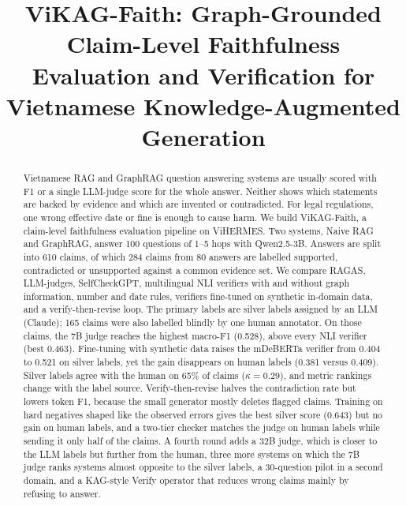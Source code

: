\documentclass[conference]{IEEEtran}
\begin{document}
\title{ViKAG-Faith: Graph-Grounded Claim-Level Faithfulness Evaluation and Verification for Vietnamese Knowledge-Augmented Generation}

\author{
}

\maketitle

\begin{abstract}
Vietnamese RAG and GraphRAG question answering systems are usually scored with F1 or a single LLM-judge score for the whole answer. Neither shows which statements are backed by evidence and which are invented or contradicted. For legal regulations, one wrong effective date or fine is enough to cause harm. We build ViKAG-Faith, a claim-level faithfulness evaluation pipeline on ViHERMES. Two systems, Naive RAG and GraphRAG, answer 100 questions of 1--5 hops with Qwen2.5-3B. Answers are split into 610 claims, of which 284 claims from 80 answers are labelled supported, contradicted or unsupported against a common evidence set. We compare RAGAS, LLM-judges, SelfCheckGPT, multilingual NLI verifiers with and without graph information, number and date rules, verifiers fine-tuned on synthetic in-domain data, and a verify-then-revise loop. The primary labels are silver labels assigned by an LLM (Claude); 165 claims were also labelled blindly by one human annotator. On those claims, the 7B judge reaches the highest macro-F1 (0.528), above every NLI verifier (best 0.463). Fine-tuning with synthetic data raises the mDeBERTa verifier from 0.404 to 0.521 on silver labels, yet the gain disappears on human labels (0.381 versus 0.409). Silver labels agree with the human on 65\% of claims ($\kappa=0.29$), and metric rankings change with the label source. Verify-then-revise halves the contradiction rate but lowers token F1, because the small generator mostly deletes flagged claims. Training on hard negatives shaped like the observed errors gives the best silver score (0.643) but no gain on human labels, and a two-tier checker matches the judge on human labels while sending it only half of the claims. A fourth round adds a 32B judge, which is closer to the LLM labels but further from the human, three more systems on which the 7B judge ranks systems almost opposite to the silver labels, a 30-question pilot in a second domain, and a KAG-style Verify operator that reduces wrong claims mainly by refusing to answer.
\end{abstract}
\end{document}
